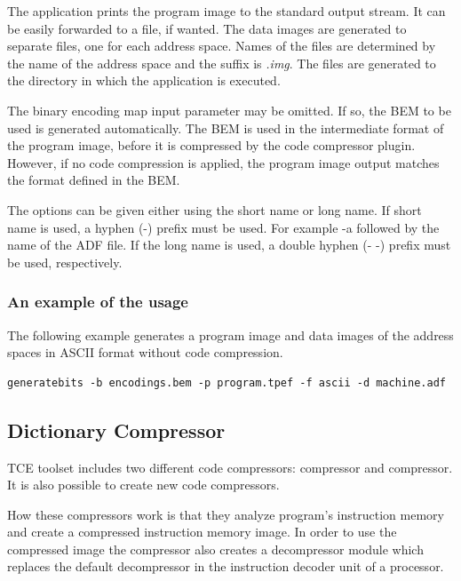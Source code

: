 \documentclass[twoside]{tceusermanual}
\begin{document}
The application prints the program image to the standard output
stream. It can be easily forwarded to a file, if wanted. The data
images are generated to separate files, one for each address
space. Names of the files are determined by the name of the address
space and the suffix is \emph{.img}. The files are generated to 
the directory in which the application is executed.

The binary encoding map input parameter may be omitted. If so, the BEM
to be used is generated automatically. The BEM is used in the
intermediate format of the program image, before it is compressed by
the code compressor plugin. However, if no code compression is
applied, the program image output matches the format defined in the
BEM.

The options can be given either using the short name or long name. If
short name is used, a hyphen (-) prefix must be used. For example -a
followed by the name of the ADF file. If the long name is used, a
double hyphen (- -) prefix must be used, respectively.

\subsubsection{An example of the usage}

The following example generates a program image and data images of the address
spaces in ASCII format without code compression.

\begin{verbatim}
generatebits -b encodings.bem -p program.tpef -f ascii -d machine.adf
\end{verbatim}

\subsection{Dictionary Compressor}

TCE toolset includes two different code compressors: 
compressor and  compressor. It is also possible to
create new code compressors.

How these compressors work is that they analyze program's instruction memory and
create a compressed instruction memory image. In order to use the compressed
image the compressor also creates a decompressor module which replaces the
default decompressor in the instruction decoder unit of a processor.
\end{document}
